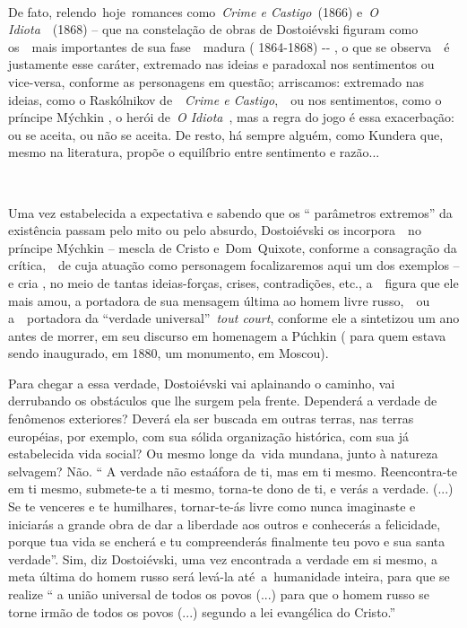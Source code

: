 ~

De fato, relendo~hoje~romances como~\emph{Crime e Castigo~}(1866)
e~\emph{O Idiota}~~(1868) -- que na constelação de obras de Dostoiévski
figuram como os~~mais importantes de sua fase~~madura ( 1864-1868) -\/-
, o que se observa~~é justamente esse caráter, extremado nas ideias e
paradoxal nos sentimentos ou vice-versa, conforme as personagens em
questão; arriscamos: extremado nas ideias, como o Raskólnikov
de~~\emph{Crime e Castigo},~\emph{~}ou nos sentimentos, como o príncipe
Mýchkin , o herói de~\emph{O Idiota}~, mas a regra do jogo é essa
exacerbação: ou se aceita, ou não se aceita. De resto, há sempre alguém,
como Kundera que, mesmo na literatura, propõe o equilíbrio entre
sentimento e razão...

~

Uma vez estabelecida a expectativa e sabendo que os `` parâmetros
extremos'' da existência passam pelo mito ou pelo absurdo, Dostoiévski
os incorpora~~no príncipe Mýchkin -- mescla de Cristo e~Dom~Quixote,
conforme a consagração da crítica,~~de cuja atuação como personagem
focalizaremos aqui um dos exemplos -- e cria , no meio de tantas
ideias-forças, crises, contradições, etc., a~~figura que ele mais amou,
a portadora de sua mensagem última ao homem livre russo,~~ou
a~~portadora da ``verdade universal''~\emph{tout court}, conforme ele a
sintetizou um ano antes de morrer, em seu discurso em homenagem a
Púchkin ( para quem estava sendo inaugurado, em 1880, um monumento, em
Moscou).

Para chegar a essa verdade, Dostoiévski vai aplainando o caminho, vai
derrubando os obstáculos que lhe surgem pela frente. Dependerá a verdade
de fenômenos exteriores? Deverá ela ser buscada em outras terras, nas
terras européias, por exemplo, com sua sólida organização histórica, com
sua já estabelecida vida social? Ou mesmo longe da~vida mundana, junto à
natureza selvagem? Não. `` A verdade não estaáfora de ti, mas em ti
mesmo. Reencontra-te em ti mesmo, submete-te a ti mesmo, torna-te dono
de ti, e verás a verdade. (...) Se te venceres e te humilhares,
tornar-te-ás livre como nunca imaginaste e iniciarás a grande obra de
dar a liberdade aos outros e conhecerás a felicidade, porque tua vida se
encherá e tu compreenderás finalmente teu povo e sua santa verdade''.
Sim, diz Dostoiévski, uma vez encontrada a verdade em si mesmo, a meta
última do homem russo será levá-la até~a~humanidade inteira, para que se
realize `` a união universal de todos os povos (...) para que o homem
russo se torne irmão de todos os povos (...) segundo a lei evangélica do
Cristo.''

